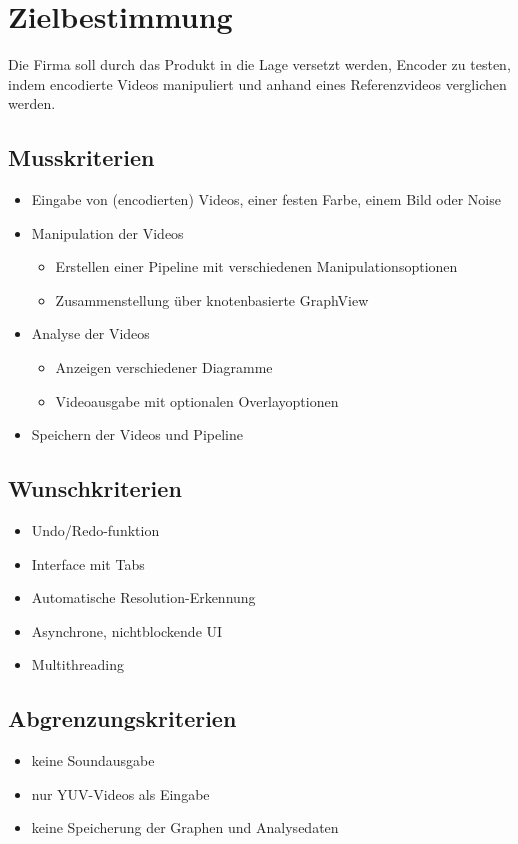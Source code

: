 \section{Zielbestimmung}

Die Firma soll durch das Produkt in die Lage versetzt werden, Encoder zu testen, indem encodierte Videos manipuliert und anhand eines Referenzvideos verglichen werden.

\subsection{Musskriterien}

\begin{itemize}
	\item Eingabe von (encodierten) Videos, einer festen Farbe, einem Bild oder Noise
	\item Manipulation der Videos
	\begin{itemize}
		\item Erstellen einer Pipeline mit verschiedenen Manipulationsoptionen
		\item Zusammenstellung über knotenbasierte GraphView
	\end{itemize}
	\item Analyse der Videos
	\begin{itemize}
		\item Anzeigen verschiedener Diagramme
		\item Videoausgabe mit optionalen Overlayoptionen
	\end{itemize}
	\item Speichern der Videos und Pipeline
\end{itemize}

\subsection{Wunschkriterien}

\begin{itemize}
	\item Undo/Redo-funktion
	\item Interface mit Tabs
	\item Automatische Resolution-Erkennung
	\item Asynchrone, nichtblockende UI
	\item Multithreading
\end{itemize}

\subsection{Abgrenzungskriterien}

\begin{itemize}
	\item keine Soundausgabe
	\item nur YUV-Videos als Eingabe
	\item keine Speicherung der Graphen und Analysedaten
\end{itemize}
